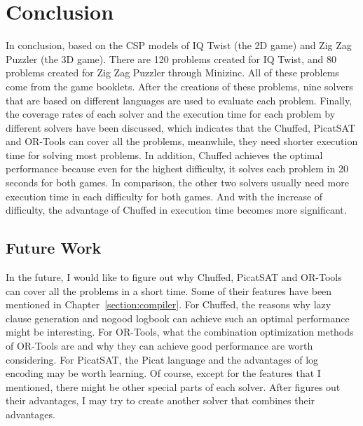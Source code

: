 \chapter{Conclusion}
\label{cha:conc}
In conclusion, based on the CSP models of IQ Twist (the 2D game) and Zig Zag Puzzler (the 3D game). There are 120 problems created for IQ Twist, and 80 problems created for Zig Zag Puzzler through Minizinc. All of these problems come from the game booklets. After the creations of these problems, nine solvers that are based on different languages are used to evaluate each problem. Finally, the coverage rates of each solver and the execution time for each problem by different solvers have been discussed, which indicates that the Chuffed, PicatSAT and OR-Tools can cover all the problems, meanwhile, they need shorter execution time for solving most problems. In addition, Chuffed achieves the optimal performance because even for the highest difficulty, it solves each problem in 20 seconds for both games. In comparison, the other two solvers usually need more execution time in each difficulty for both games. And with the increase of difficulty, the advantage of Chuffed in execution time becomes more significant. 
\section{Future Work}
\label{sec:future}
In the future, I would like to figure out why Chuffed, PicatSAT and OR-Tools can cover all the problems in a short time. Some of their features have been mentioned in Chapter~\ref{section:compiler}. 
For Chuffed, the reasons why lazy clause generation and nogood logbook can achieve such an optimal performance might be interesting. 
For OR-Tools, what the combination optimization methods of OR-Tools are and why they can achieve good performance are worth considering.
For PicatSAT, the Picat language and the advantages of log encoding may be worth learning.
Of course, except for the features that I mentioned, there might be other special parts of each solver. After figures out their advantages, I may try to create another solver that combines their advantages.



